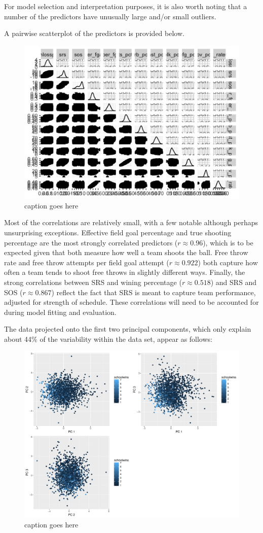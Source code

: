 \documentclass[10pt,a4paper, hidelinks]{article} %
\begin{document}
For model selection and interpretation purposes, it is also worth noting that a number of the predictors have unusually large and/or small outliers.

A pairwise scatterplot of the predictors is provided below.

\begin{figure}
	\centering
	\includegraphics[width=0.7\linewidth]{../fig/MoneyMaker}
	\caption{caption goes here}
	\label{fig:ggpairs}
\end{figure}


Most of the correlations are relatively small, with a few notable although perhaps unsurprising exceptions. Effective field goal percentage and true shooting percentage are the most strongly correlated predictors ($r \approx 0.96$), which is to be expected given that both measure how well a team shoots the ball. Free throw rate and free throw attempts per field goal attempt ($r \approx 0.922$) both capture how often a team tends to shoot free throws in slightly different ways. Finally, the strong correlations between SRS and wining percentage ($r \approx 0.518$) and SRS and SOS ($r \approx 0.867$) reflect the fact that SRS is meant to capture team performance, adjusted for strength of schedule. These correlations will need to be accounted for during model fitting and evaluation.

The data projected onto the first two principal components, which only explain about 44\% of the variability within the data set, appear as follows:

\begin{figure}
	\centering
	\includegraphics[width=0.7\linewidth]{../fig/PrinComps}
	\caption{caption goes here}
	\label{fig:princomps}
\end{figure}
\end{document}
